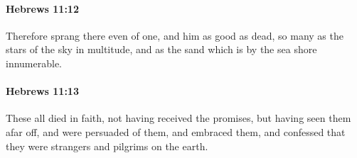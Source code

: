		\paragraph{Hebrews 11:12} %
			\label{HEBREWS-11-12}

			Therefore sprang there even of one, and him as good as dead, so many as the stars of the sky in multitude, and as the sand which is by the sea shore innumerable.

			\begin{framed}
			\scriptsize
				\begin{compactdesc}
					\item[SBLG] 
				\end{compactdesc}
			\end{framed}

		\paragraph{Hebrews 11:13} %
			\label{HEBREWS-11-13}

			These all died in faith, not having received the promises, but having seen them afar off, and were persuaded of them, and embraced them, and confessed that they were strangers and pilgrims on the earth.

